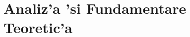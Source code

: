 \documentclass[12pt,a4paper,twoside]{report}
\begin{document}







\chapter{Analiz'a 'si Fundamentare Teoretic'a}
\label{ch:analysis}


\end{document}
